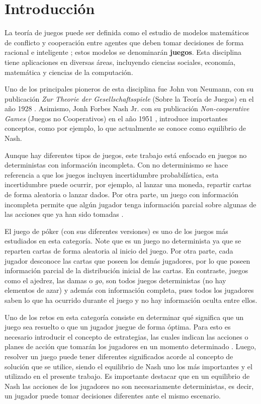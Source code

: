 \chapter*{Introducción}

La teoría de juegos puede ser definida como el estudio de modelos matemáticos de conflicto y cooperación entre agentes que deben tomar decisiones de forma racional e inteligente \cite[p.~1]{bib:game-theory-book}; estos modelos se denominarán \textbf{juegos}. Esta disciplina tiene aplicaciones en diversas áreas, incluyendo ciencias sociales, economía, matemática y ciencias de la computación.

Uno de los principales pioneros de esta disciplina fue John von Neumann, con su publicación \textit{Zur Theorie der Gesellschaftsspiele} (Sobre la Teoría de Juegos) en el año 1928 \cite{bib:von-neumann}. Asimismo, Jonh Forbes Nash Jr. con su publicación \textit{Non-cooperative Games} (Juegos no Cooperativos) en el año 1951 \cite{bib:nash}, introduce importantes conceptos, como por ejemplo, lo que actualmente se conoce como equilibrio de Nash.

Aunque hay diferentes tipos de juegos, este trabajo está enfocado en juegos no deterministas con información incompleta. Con no determinismo se hace referencia a que los juegos incluyen incertidumbre probabilística, esta incertidumbre puede ocurrir, por ejemplo, al lanzar una moneda, repartir cartas de forma aleatoria o lanzar dados. Por otra parte, un juego con información incompleta permite que algún jugador tenga información parcial sobre algunas de las acciones que ya han sido tomadas \cite[p.~199]{bib:course-game-theory}.

El juego de póker (con sus diferentes versiones) es uno de los juegos más estudiados en esta categoría. Note que es un juego no determinista ya que se reparten cartas de forma aleatoria al inicio del juego. Por otra parte, cada jugador desconoce las cartas que poseen los demás jugadores, por lo que poseen información parcial de la distribución inicial de las cartas. En contraste, juegos como el ajedrez, las damas o \textit{go}, son todos juegos deterministas (no hay elementos de azar) y además con información completa, pues todos los jugadores saben lo que ha ocurrido durante el juego y no hay información oculta entre ellos.

Uno de los retos en esta categoría consiste en determinar qué significa que un juego sea resuelto o que un jugador juegue de forma óptima. Para esto es necesario introducir el concepto de estrategias, las cuales indican las acciones o planes de acción que tomarán los jugadores en un momento determinado \cite[p.~24]{bib:teoria-juegos-es}. Luego, resolver un juego puede tener diferentes significados acorde al concepto de solución que se utilice, siendo el equilibrio de Nash uno los más importantes y el utilizado en el presente trabajo. Es importante destacar que en un equilibrio de Nash las acciones de los jugadores no son necesariamente deterministas, es decir, un jugador puede tomar decisiones diferentes ante el mismo escenario.

